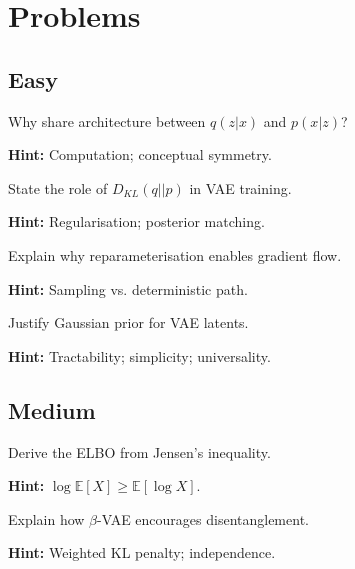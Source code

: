 
\section*{Problems}

\subsection*{Easy}

\begin{problem}
Why share architecture between $q(z|x)$ and $p(x|z)$?

\textbf{Hint:} Computation; conceptual symmetry.
\end{problem}

\begin{problem}[KL in ELBO]
State the role of $D_{KL}(q||p)$ in VAE training.

\textbf{Hint:} Regularisation; posterior matching.
\end{problem}

\begin{problem}
Explain why reparameterisation enables gradient flow.

\textbf{Hint:} Sampling vs. deterministic path.
\end{problem}

\begin{problem}
Justify Gaussian prior for VAE latents.

\textbf{Hint:} Tractability; simplicity; universality.
\end{problem}

\subsection*{Medium}

\begin{problem}
Derive the ELBO from Jensen's inequality.

\textbf{Hint:} $\log \mathbb{E}[X] \geq \mathbb{E}[\log X]$.
\end{problem}

\begin{problem}
Explain how $\beta$-VAE encourages disentanglement.

\textbf{Hint:} Weighted KL penalty; independence.
\end{problem}

